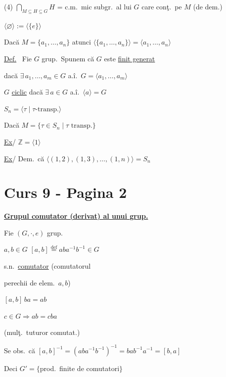 \noindent (4) $\displaystyle\bigcap_{M\subseteq H\subseteq G} H$ = c.m.\ mic subgr.\ al lui $G$ care conţ.\ pe $M$ \quad (de dem.)

\bigskip
\noindent $\langle\varnothing\rangle := \langle\{e\}\rangle$

\bigskip
\noindent Dacă $M=\{a_1,\ldots,a_n\}$ atunci $\langle\{a_1,\ldots,a_n\}\rangle = \langle a_1,\ldots,a_n\rangle$

\bigskip
\noindent\underline{Def.} \ Fie $G$ grup.\ Spunem că $G$ este \underline{finit generat}

\noindent dacă $\exists\,a_1,\ldots,a_m\in G$ a.î.\ $G=\langle a_1,\ldots,a_m\rangle$

\bigskip
\noindent $G$ \underline{ciclic} dacă $\exists\,a\in G$ a.î.\ $\langle a\rangle=G$

\bigskip
\noindent $S_n = \langle \tau \mid \tau\text{-transp.}\rangle$

\noindent Dacă $M=\{\tau\in S_n \mid \tau \text{ transp.}\}$

\bigskip
\noindent\underline{Ex}/ \quad $\mathbb{Z} = \langle 1\rangle$

\bigskip
\noindent\underline{Ex}/ \quad Dem.\ că $\big\langle (1,2),(1,3),\ldots,(1,n)\big\rangle = S_n$



\section*{Curs 9 - Pagina 2}

\noindent\underline{\textbf{Grupul comutator (derivat) al unui grup.}}

\bigskip
\noindent Fie $(G,\cdot,e)$ grup.

\noindent $a,b\in G$ \quad $[a,b] \overset{\text{def}}{=} aba^{-1}b^{-1}\in G$

\noindent s.n.\ \underline{comutator} (comutatorul

\noindent perechii de elem.\ $a,b$)

\bigskip
\noindent $[a,b]\,ba = ab$

\noindent $c\in G \Rightarrow ab=cba$

\bigskip
\noindent{} \quad (mulţ.\ tuturor comutat.)

\bigskip
\noindent Se obs.\ că $[a,b]^{-1} = (aba^{-1}b^{-1})^{-1} = bab^{-1}a^{-1} = [b,a]$

\noindent Deci $G' = \{$prod.\ finite de comutatori$\}$

